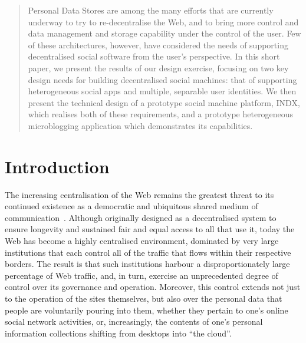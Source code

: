 \documentclass{sig-alternate}
\begin{document}
\maketitle


\begin{abstract}
Personal Data Stores are among the many efforts that are currently underway to try to re-decentralise the Web, and to bring more control and data management and storage capability under the control of the user.  Few of these architectures, however, have considered the needs of supporting decentralised social software from  the user's perspective. In this short paper, we present the results of our design exercise, focusing on two key design needs for building decentralised social machines: that of supporting heterogeneous social apps and multiple, separable user identities. We then present the technical design of a prototype social machine platform, INDX, which realises both of these requirements, and a prototype heterogeneous microblogging application which demonstrates its capabilities.
\end{abstract}




\section{Introduction}

The increasing centralisation of the Web remains the greatest threat to its continued existence as a democratic and ubiquitous shared medium of communication~\cite{redecent}. Although originally designed as a decentralised system to ensure longevity and sustained fair and equal access to all that use it, today the Web has become a highly centralised environment, dominated by very large institutions that each control all of the traffic that flows within their respective borders.  The result is that such institutions harbour a disproportionately large percentage of Web traffic, and, in turn, exercise an unprecedented degree of control over its governance and operation.  Moreover, this control extends not just to the operation of the sites themselves, but also over the personal data that people are voluntarily pouring into them, whether they pertain to one's online social network activities, or, increasingly, the contents of one's personal information collections shifting from desktops into ``the cloud''.
\end{document}
